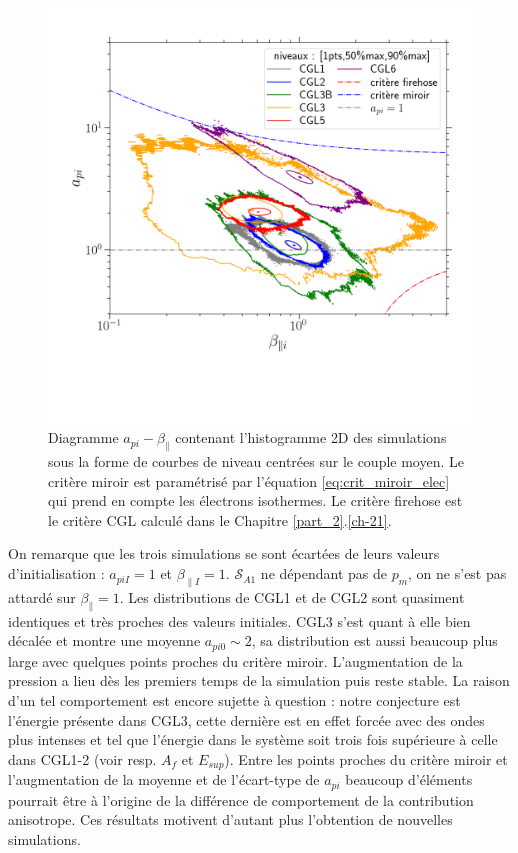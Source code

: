 \begin{figure}[!ht]
 \centering
\includegraphics[width=1\linewidth,trim=1cm 7cm 2cm 1cm, clip=true]{./Part_3/images_ch3/diag_apbeta}
\cprotect\caption{Diagramme $a_{pi}-\beta_{\parallel}$ contenant l'histogramme \acs{2D} des simulations sous la forme de courbes de niveau centrées sur le couple moyen. Le critère miroir est paramétrisé par l'équation \eqref{eq:crit_miroir_elec} qui prend en compte les électrons isothermes. Le critère firehose est le critère CGL calculé dans le Chapitre \ref{part_2}.\ref{ch-21}. }
\label{fig:diag_simu_CGL}
\end{figure} 
On remarque que les trois simulations se sont écartées de leurs valeurs d'initialisation : $a_{piI} = 1$ et $\beta_{\parallel I} = 1$. $ \mathcal{S}_{A1}$ ne dépendant pas de $p_m$, on ne s'est pas attardé sur $\beta_{\parallel} = 1$.  Les distributions de CGL1 et de CGL2 sont quasiment identiques et très proches des valeurs initiales. CGL3 s'est quant à elle bien décalée et montre une moyenne  $a_{pi0}\sim 2$, sa distribution est aussi beaucoup plus large avec quelques points proches du critère miroir. L'augmentation de la pression a lieu dès les premiers temps de la simulation puis reste stable. La raison d'un tel comportement est encore sujette à question : notre conjecture est l'énergie présente dans CGL3, cette dernière est en effet forcée avec des ondes plus intenses et tel que l'énergie dans le système soit trois fois supérieure à celle dans CGL1-2 (voir resp. $A_f$ et $E_{sup}$). Entre les points proches du critère miroir et l'augmentation de la moyenne et de l'écart-type de $a_{pi}$ beaucoup d'éléments pourrait être à l'origine de la différence de comportement de la contribution anisotrope. Ces résultats motivent d'autant plus l'obtention de nouvelles simulations. 

